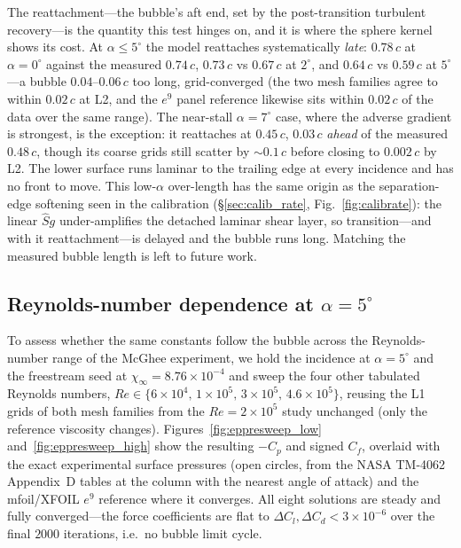 \documentclass[journal]{new-aiaa}
\begin{document}
The reattachment---the bubble's aft end, set by the post-transition turbulent
recovery---is the quantity this test hinges on, and it is where the sphere
kernel shows its cost. At $\alpha\!\le\!5^\circ$ the model reattaches
systematically \emph{late}: $0.78\,c$ at $\alpha\!=\!0^\circ$ against the
measured $0.74\,c$, $0.73\,c$ vs $0.67\,c$ at $2^\circ$, and $0.64\,c$ vs
$0.59\,c$ at $5^\circ$---a bubble $0.04$--$0.06\,c$ too long, grid-converged (the
two mesh families agree to within $0.02\,c$ at L2, and the $e^9$ panel
reference likewise sits within $0.02\,c$ of the data over the same range). The
near-stall $\alpha\!=\!7^\circ$ case, where the adverse gradient is strongest, is
the exception: it reattaches at $0.45\,c$, $0.03\,c$ \emph{ahead} of the measured
$0.48\,c$, though its coarse grids still scatter by $\sim\!0.1\,c$ before closing to
$0.002\,c$ by L2. The lower surface runs laminar to the trailing edge at every
incidence and has no front to move. This low-$\alpha$ over-length has the same
origin as the separation-edge softening seen in the calibration
(\S\ref{sec:calib_rate}, Fig.~\ref{fig:calibrate}): the linear $\hat S g$
under-amplifies the detached laminar shear layer, so transition---and with it
reattachment---is delayed and the bubble runs long. Matching the measured bubble
length is left to future work.


\subsection{Reynolds-number dependence at $\alpha\!=\!5^\circ$}\label{sec:eppresweep}

To assess whether the same constants follow the bubble across the
Reynolds-number range of the McGhee experiment, we hold the incidence at
$\alpha\!=\!5^\circ$ and the freestream seed at
$\chi_\infty\!=\!8.76\!\times\!10^{-4}$ and sweep the four other tabulated
Reynolds numbers,
$Re\!\in\!\{6\!\times\!10^4,\,1\!\times\!10^5,\,3\!\times\!10^5,\,4.6\!\times\!10^5\}$,
reusing the L1 grids of both mesh families from the $Re\!=\!2\!\times\!10^5$
study unchanged (only the reference viscosity changes).
Figures~\ref{fig:eppresweep_low} and~\ref{fig:eppresweep_high} show the resulting
$-C_p$ and signed $C_f$, overlaid with the exact experimental surface pressures
(open circles, from the NASA TM-4062 Appendix~D tables at the column with the
nearest angle of attack) and the mfoil/XFOIL $e^9$ reference where it converges.
All eight solutions are steady and fully converged---the force
coefficients are flat to $\Delta C_l,\Delta C_d\!<\!3\!\times\!10^{-6}$
over the final $2000$ iterations, i.e.\ no bubble limit cycle.
\end{document}
